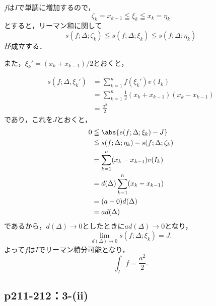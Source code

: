 \documentclass[uplatex,dvipdfmx,a4paper,10pt,fleqn]{jsarticle}
\begin{document}
    \begin{tleftbar}
        $f$は$I$で単調に増加するので，
        \[
        \zeta_k = x_{k-1} \leqq \xi_k \leqq x_k=\eta_k 
        \]
        とすると，リーマン和に関して
        \[
        s(f;\Delta ; \zeta_k ) \leqq s(f;\Delta;\xi_k) \leqq s(f;\Delta;\eta_k)
        \]
        が成立する．
        
        また，$\xi_k' = (x_k+x_{k-1} )/2 $とおくと，
        
        \begin{align*}
        s(f;\Delta,\xi_k' )& = \sum_{k=1}^{n} f(\xi_k ') v(I_k) \\
        & =  \sum_{k=1}^{n} \frac{1}{2} (x_k +x_{k-1})(x_k - x_{k-1}) \\
        & = \frac{a^2}{2}
        \end{align*}
        であり，これを$J$とおくと，
        \begin{align*} 
        0 &\leqq \abs{s(f;\Delta; \xi_k)-J }\\
        & \leqq  s(f;\Delta;\eta_k) -s(f;\Delta ; \zeta_k ) \\
        & = \sum_{k=1}^{n} (x_k-x_{k-1} ) v(I_k) \\
        & = d(\Delta) \sum_{k=1}^{n} (x_k-x_{k-1} ) \\
        & = (a-0) d(\Delta)\\
        & =a d(\Delta)
        \end{align*}
        であるから，$d (\Delta) \to 0$としたときに$a d(\Delta) \to 0$となり，
        \[
        \lim_{d(\Delta) \to 0} s(f;\Delta; \xi_k)=J.
        \]
        よって$f$は$I$でリーマン積分可能となり，
        \[
        \int_{I} f = \frac{a^2}{2}.
        \]
        \end{tleftbar}
        

        \subsection*{p211-212：3-(ii)}
\end{document}
